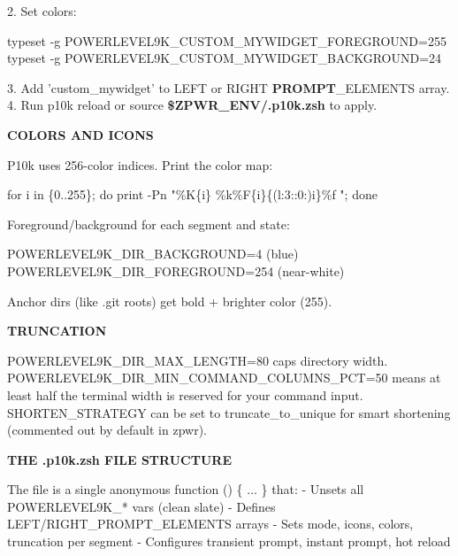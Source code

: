 \documentclass[11pt,a4paper,twoside]{book}
\begin{document}
2. Set colors:

\begin{codebox}
\color{neongreen}typeset -g POWERLEVEL9K\_CUSTOM\_MYWIDGET\_FOREGROUND=255\\
\color{neongreen}typeset -g POWERLEVEL9K\_CUSTOM\_MYWIDGET\_BACKGROUND=24\\
\end{codebox}

3. Add 'custom\_mywidget' to LEFT or RIGHT \textbf{PROMPT}\_ELEMENTS array. 4. Run p10k reload or source \textbf{\$ZPWR\_ENV/.p10k.zsh} to apply.


\vspace{12pt}
{\bfseries\color{neonyellow} COLORS AND ICONS}\vspace{4pt}

P10k uses 256-color indices. Print the color map:

\begin{codebox}
\color{neongreen}for i in \{0..255\}; do print -Pn "\%K\{i\}  \%k\%F\{i\}\{(l:3::0:)i\}\%f "; done\\
\end{codebox}

Foreground/background for each segment and state:

\begin{codebox}
\color{neongreen}POWERLEVEL9K\_DIR\_BACKGROUND=4        (blue)\\
\color{neongreen}POWERLEVEL9K\_DIR\_FOREGROUND=254      (near-white)\\
\end{codebox}

Anchor dirs (like .git roots) get bold + brighter color (255).


\vspace{12pt}
{\bfseries\color{neonyellow} TRUNCATION}\vspace{4pt}

POWERLEVEL9K\_DIR\_MAX\_LENGTH=80 caps directory width. POWERLEVEL9K\_DIR\_MIN\_COMMAND\_COLUMNS\_PCT=50 means at least half the terminal width is reserved for your command input. SHORTEN\_STRATEGY can be set to truncate\_to\_unique for smart shortening (commented out by default in zpwr).


\vspace{12pt}
{\bfseries\color{neonyellow} THE .p10k.zsh FILE STRUCTURE}\vspace{4pt}

The file is a single anonymous function () \{ ... \} that: - Unsets all POWERLEVEL9K\_* vars (clean slate) - Defines LEFT/RIGHT\_PROMPT\_ELEMENTS arrays - Sets mode, icons, colors, truncation per segment - Configures transient prompt, instant prompt, hot reload
\end{document}
